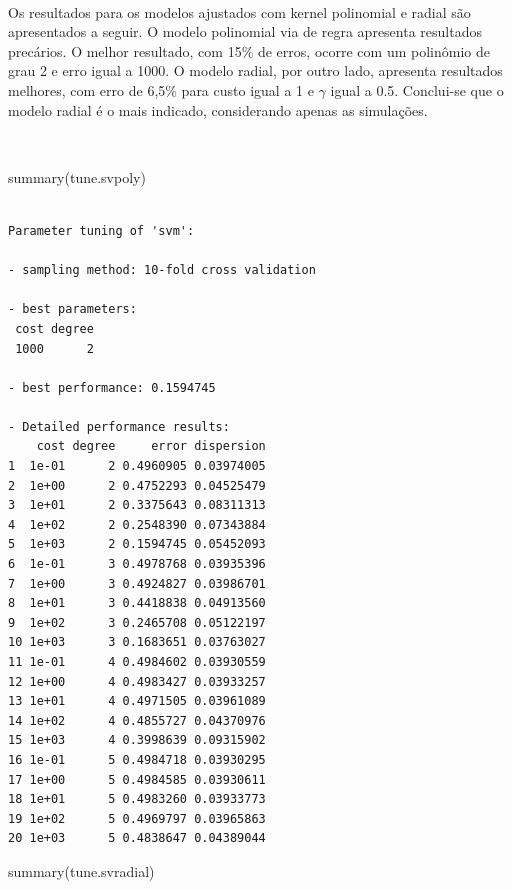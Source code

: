 \documentclass[
  a4paperpaper,
]{article}
\newenvironment{Shaded}{\begin{snugshade}}{\end{snugshade}}
\newcommand{\FunctionTok}[1]{\textcolor[rgb]{0.28,0.35,0.67}{#1}}
\newcommand{\NormalTok}[1]{\textcolor[rgb]{0.00,0.23,0.31}{#1}}
\begin{document}
~

Os resultados para os modelos ajustados com kernel polinomial e radial
são apresentados a seguir. O modelo polinomial via de regra apresenta
resultados precários. O melhor resultado, com 15\% de erros, ocorre com
um polinômio de grau 2 e erro igual a 1000. O modelo radial, por outro
lado, apresenta resultados melhores, com erro de 6,5\% para custo igual
a 1 e \(\gamma\) igual a 0.5. Conclui-se que o modelo radial é o mais
indicado, considerando apenas as simulações.

~

\begin{Shaded}
\begin{Highlighting}[]
\FunctionTok{summary}\NormalTok{(tune.svpoly)}
\end{Highlighting}
\end{Shaded}

\begin{verbatim}

Parameter tuning of 'svm':

- sampling method: 10-fold cross validation 

- best parameters:
 cost degree
 1000      2

- best performance: 0.1594745 

- Detailed performance results:
    cost degree     error dispersion
1  1e-01      2 0.4960905 0.03974005
2  1e+00      2 0.4752293 0.04525479
3  1e+01      2 0.3375643 0.08311313
4  1e+02      2 0.2548390 0.07343884
5  1e+03      2 0.1594745 0.05452093
6  1e-01      3 0.4978768 0.03935396
7  1e+00      3 0.4924827 0.03986701
8  1e+01      3 0.4418838 0.04913560
9  1e+02      3 0.2465708 0.05122197
10 1e+03      3 0.1683651 0.03763027
11 1e-01      4 0.4984602 0.03930559
12 1e+00      4 0.4983427 0.03933257
13 1e+01      4 0.4971505 0.03961089
14 1e+02      4 0.4855727 0.04370976
15 1e+03      4 0.3998639 0.09315902
16 1e-01      5 0.4984718 0.03930295
17 1e+00      5 0.4984585 0.03930611
18 1e+01      5 0.4983260 0.03933773
19 1e+02      5 0.4969797 0.03965863
20 1e+03      5 0.4838647 0.04389044
\end{verbatim}

\begin{Shaded}
\begin{Highlighting}[]
\FunctionTok{summary}\NormalTok{(tune.svradial)}
\end{Highlighting}
\end{Shaded}
\end{document}
